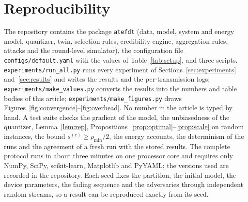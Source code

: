 \section{Reproducibility}
\label{app:repro}
\begin{revblock}The repository contains the package \texttt{atefdt} (data, model, system and energy model, quantizer, twin, selection rules, credibility engine, aggregation rules, attacks and the round-level simulator), the configuration file \texttt{configs/default.yaml} with the values of Table~\ref{tab:setup}, and three scripts. \texttt{experiments/run\_all.py} runs every experiment of Sections~\ref{sec:experiments} and~\ref{sec:results} and writes the results and the per-transmission logs; \texttt{experiments/make\_values.py} converts the results into the numbers and table bodies of this article; \texttt{experiments/make\_figures.py} draws Figures~\ref{fig:convergence}--\ref{fig:overhead}. No number in the article is typed by hand. A test suite checks the gradient of the model, the unbiasedness of the quantizer, Lemma~\ref{lem:rep}, Propositions~\ref{prop:optimal}--\ref{prop:scale} on random instances, the bound $s^{(r)}\ge\rho_{\min}/2$, the energy accounts, the determinism of the runs and the agreement of a fresh run with the stored results. The complete protocol runs in about three minutes on one processor core and requires only NumPy, SciPy, scikit-learn, Matplotlib and PyYAML; the versions used are recorded in the repository. Each seed fixes the partition, the initial model, the device parameters, the fading sequence and the adversaries through independent random streams, so a result can be reproduced exactly from its seed.\end{revblock}
